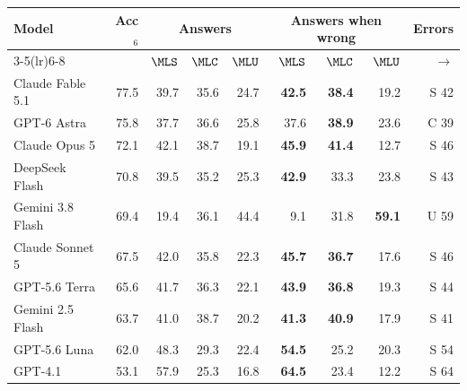 \begin{tabularx}{\linewidth}{@{}Xr rrr rrr r@{}}
\toprule
Model & Acc$_6$ & \multicolumn{3}{c}{Answers} & \multicolumn{3}{c}{Answers when wrong} & Errors\\
\cmidrule(lr){3-5}\cmidrule(lr){6-8}
 & & $\MLS$ & $\MLC$ & $\MLU$ & $\MLS$ & $\MLC$ & $\MLU$ & $\rightarrow$\\
\midrule
Claude Fable 5.1 & 77.5 & 39.7 & 35.6 & 24.7 & \textbf{42.5} & \textbf{38.4} & 19.2 & S 42\\
GPT-6 Astra & 75.8 & 37.7 & 36.6 & 25.8 & 37.6 & \textbf{38.9} & 23.6 & C 39\\
Claude Opus 5 & 72.1 & 42.1 & 38.7 & 19.1 & \textbf{45.9} & \textbf{41.4} & 12.7 & S 46\\
DeepSeek Flash & 70.8 & 39.5 & 35.2 & 25.3 & \textbf{42.9} & 33.3 & 23.8 & S 43\\
Gemini 3.8 Flash & 69.4 & 19.4 & 36.1 & 44.4 & 9.1 & 31.8 & \textbf{59.1} & U 59\\
Claude Sonnet 5 & 67.5 & 42.0 & 35.8 & 22.3 & \textbf{45.7} & \textbf{36.7} & 17.6 & S 46\\
GPT-5.6 Terra & 65.6 & 41.7 & 36.3 & 22.1 & \textbf{43.9} & \textbf{36.8} & 19.3 & S 44\\
Gemini 2.5 Flash & 63.7 & 41.0 & 38.7 & 20.2 & \textbf{41.3} & \textbf{40.9} & 17.9 & S 41\\
GPT-5.6 Luna & 62.0 & 48.3 & 29.3 & 22.4 & \textbf{54.5} & 25.2 & 20.3 & S 54\\
GPT-4.1 & 53.1 & 57.9 & 25.3 & 16.8 & \textbf{64.5} & 23.4 & 12.2 & S 64\\
\bottomrule
\end{tabularx}
